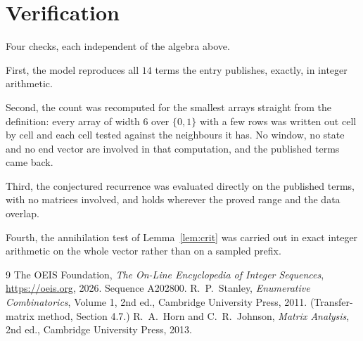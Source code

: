 \documentclass[11pt,a4paper]{article}
\theoremstyle{plain}
\theoremstyle{definition}
\begin{document}
\section{Verification}

Four checks, each independent of the algebra above.

First, the model reproduces all $14$ terms the entry publishes, exactly, in integer
arithmetic.

Second, the count was recomputed for the smallest arrays straight from the definition: every
array of width $6$ over $\{0,1\}$ with a few rows was written out cell by cell and each cell
tested against the neighbours it has. No window, no state and no end vector are involved in that
computation, and the published terms came back.

Third, the conjectured recurrence was evaluated directly on the published terms, with no
matrices involved, and holds wherever the proved range and the data overlap.

Fourth, the annihilation test of Lemma~\ref{lem:crit} was carried out in exact integer
arithmetic on the whole vector rather than on a sampled prefix.

\begin{thebibliography}{9}
 The OEIS Foundation, \emph{The On-Line Encyclopedia of Integer
Sequences}, \url{https://oeis.org}, 2026. Sequence A202800.
 R.~P.~Stanley, \emph{Enumerative Combinatorics}, Volume 1, 2nd ed.,
Cambridge University Press, 2011. (Transfer-matrix method, Section 4.7.)
 R.~A.~Horn and C.~R.~Johnson, \emph{Matrix Analysis}, 2nd ed., Cambridge
University Press, 2013.
\end{thebibliography}
\end{document}
